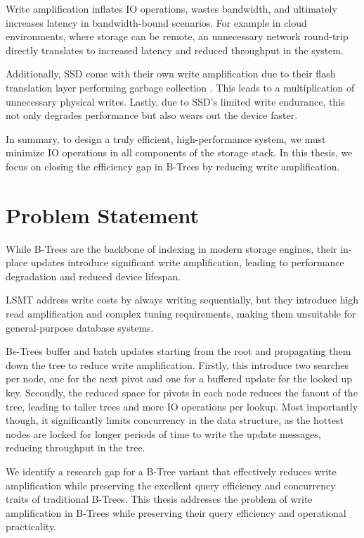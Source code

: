 Write amplification inflates \ac{IO} operations, wastes bandwidth, and ultimately increases latency in bandwidth-bound scenarios.
For example in cloud environments, where storage can be remote, an unnecessary network round-trip directly translates to increased latency and reduced throughput in the system.

Additionally, \ac{SSD} come with their own write amplification due to their flash translation layer performing garbage collection \cite{haas2023modern}. 
This leads to a multiplication of unnecessary physical writes. 
Lastly, due to \ac{SSD}'s limited write endurance, this not only degrades performance but also wears out the device faster.

In summary, to design a truly efficient, high-performance system, we must minimize \ac{IO} operations in all components of the storage stack. 
In this thesis, we focus on closing the efficiency gap in B-Trees by reducing write amplification.

\section{Problem Statement}
While B-Trees are the backbone of indexing in modern storage engines, their in-place updates introduce significant write amplification, leading to performance degradation and reduced device lifespan. 

\ac{LSMT} address write costs by always writing sequentially, but they introduce high read amplification and complex tuning requirements, making them unsuitable for general-purpose database systems.

B$\epsilon$-Trees buffer and batch updates starting from the root and propagating them down the tree to reduce write amplification. 
Firstly, this introduce two searches per node, one for the next pivot and one for a buffered update for the looked up key.
Secondly, the reduced space for pivots in each node reduces the fanout of the tree, leading to taller trees and more \ac{IO} operations per lookup.
Most importantly though, it significantly limits concurrency in the data structure, as the hottest nodes are locked for longer periods of time to write the update messages, reducing throughput in the tree.

We identify a research gap for a B-Tree variant that effectively reduces write amplification while preserving the excellent query efficiency and concurrency traits of traditional B-Trees.
This thesis addresses the problem of write amplification in B-Trees while preserving their query efficiency and operational practicality.

